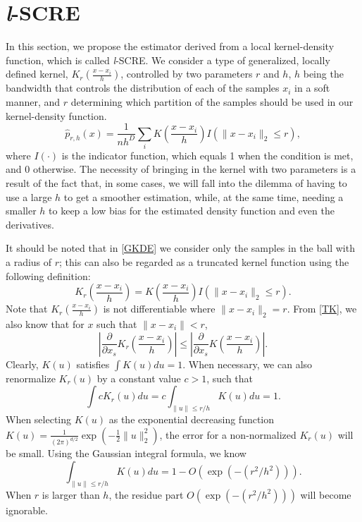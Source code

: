 \documentclass[aos,preprint]{imsart}
\theoremstyle{remark}
\begin{document}
\section{{\it l}-SCRE}
In this section, we propose the estimator derived from a local kernel-density function, which is called {\it l}-SCRE.
We consider a type of generalized, locally defined kernel, $K_r (\frac{x-x_i}{h})$, controlled by two parameters $r$ and $h$, $h$ being the bandwidth that controls the distribution of each of the samples $x_i$ in a soft manner, and $r$ determining which partition of the samples should be used in our kernel-density function.
\begin{equation}\label{GKDE}
\hat{p}_{r, h}(x) = \frac{1}{n h^D}\sum_i K(\frac{x-x_i}{h}) I(\|x -x_i\|_2\leq r),
\end{equation}
where $I(\cdot)$ is the indicator function, which equals 1 when the condition is met, and 0 otherwise.
The necessity of bringing in the kernel with two parameters is a result of the fact that, in some cases, we will fall into the dilemma of having to use a large $h$ to get a smoother estimation, while, at the same time, needing a smaller $h$ to keep a low bias for the estimated density function and even the derivatives.

It should be noted that in \eqref{GKDE} we consider only the samples in the ball with a radius of $r$; this can also be regarded as a truncated kernel function using the following definition:
\begin{equation}\label{TK}
K_r(\frac{x-x_i}{h}) = K(\frac{x-x_i}{h}) I(\|x -x_i\|_2\leq r).
\end{equation}
Note that $K_r(\frac{x-x_i}{h})$ is not differentiable where $\|x-x_i\|_2=r$. From \eqref{TK}, we also know that for $x$ such that $\|x-x_i\|< r$,
\begin{equation}\label{DTK}
|\frac{\partial}{\partial x_s} K_r(\frac{x-x_i}{h}) | \leq |\frac{\partial}{\partial x_s} K(\frac{x-x_i}{h})|.
\end{equation}
Clearly, $K(u)$ satisfies $\int K(u)du=1$. When necessary, we can also renormalize $K_r(u)$ by a constant value $c>1$, such that
\[
\int c K_r (u) du =  c\int_{\|u\|\leq r/h} K(u) du= 1.
\]
When selecting $K(u)$ as the exponential decreasing function $K(u) = \frac{1}{{(2\pi)}^{d/2}}\exp(-\frac{1}{2}\|u\|^2_2)$, the error for a non-normalized $K_r(u)$ will be small. Using the Gaussian integral formula, we know 
\begin{equation}\label{Perror}
 \int_{\|u\|\leq r/h} K(u) du =1- O(\exp(-(r^2/h^2))).
\end{equation}
When $r$ is larger than $h$, the residue part $O(\exp(-(r^2/h^2)))$ will become ignorable. %
\end{document}
